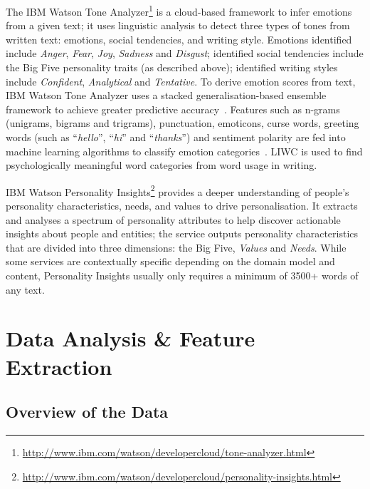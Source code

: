 \documentclass[graybox]{svmult}
\begin{document}

The IBM Watson Tone
Analyzer\footnote{\url{http://www.ibm.com/watson/developercloud/tone-analyzer.html}}
is a cloud-based framework to infer emotions from a given text; it
uses linguistic analysis to detect three types of tones from written
text: emotions, social tendencies, and writing style. Emotions
identified include {\emph{Anger}}, {\emph{Fear}}, {\emph{Joy}},
{\emph{Sadness}} and {\emph{Disgust}}; identified social tendencies
include the Big Five personality traits (as described above);
identified writing styles include {\emph{Confident}},
{\emph{Analytical}} and {\emph{Tentative}}. To derive emotion scores
from text, IBM Watson Tone Analyzer uses a stacked
generalisation-based ensemble framework to achieve greater predictive
accuracy~\citep{costa+mccrae:1992}.  Features such as n-grams
(unigrams, bigrams and trigrams), punctuation, emoticons, curse words,
greeting words (such as ``{\emph{hello}}'', ``{\emph{hi}}'' and
``{\emph{thanks}}'') and sentiment polarity are fed into machine
learning algorithms to classify emotion
categories~\citep{fellbaum:2006}. LIWC is used to find psychologically
meaningful word categories from word usage in writing.

IBM Watson Personality
Insights\footnote{\url{http://www.ibm.com/watson/developercloud/personality-insights.html}}
provides a deeper understanding of people's personality
characteristics, needs, and values to drive personalisation. It
extracts and analyses a spectrum of personality attributes to help
discover actionable insights about people and entities; the service
outputs personality characteristics that are divided into three
dimensions: the Big Five, {\emph{Values}} and {\emph{Needs}}. While
some services are contextually specific depending on the domain model
and content, Personality Insights usually only requires a minimum of
3500+ words of any text.


\section{Data Analysis \& Feature Extraction}

\subsection{Overview of the Data}
\end{document}
